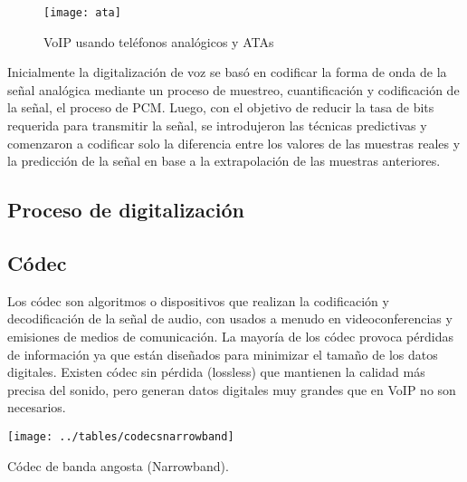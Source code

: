 	
		\begin{figure}[h]
			
			\texttt{[image: ata]}
			
			\caption{VoIP usando teléfonos analógicos y ATAs}
			
			\centering
			
			\label{fig:ata}
		\end{figure}
		
		
Inicialmente la digitalización de voz se basó en codificar la forma de onda de la señal analógica mediante un proceso de muestreo, cuantificación y codificación de la señal, el proceso de PCM. Luego, con el objetivo de reducir la tasa de bits requerida para transmitir la señal, se introdujeron las técnicas predictivas y comenzaron a codificar solo la diferencia entre los valores de las muestras reales y la predicción de la señal en base a la extrapolación de las muestras anteriores.

\subsection{Proceso de digitalización}



\subsection{Códec}

Los códec son algoritmos o dispositivos que realizan la codificación y decodificación de la señal de audio, con usados a menudo en videoconferencias y emisiones de medios de comunicación. La mayoría de los códec provoca pérdidas de información ya que están diseñados para minimizar el tamaño de los datos digitales. Existen códec sin pérdida (lossless) que mantienen la calidad más precisa del sonido, pero generan datos digitales muy grandes que en VoIP no son necesarios.

		\begin{table}[h]
			
			\texttt{[image: ../tables/codecsnarrowband]}
			
			\caption{Códec de banda angosta (Narrowband).}
			
			\centering
			
			\label{tab:narrow}
		\end{table}


